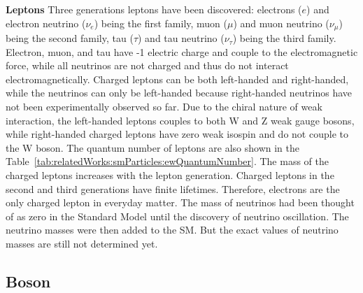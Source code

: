 \noindent \textbf{Leptons} Three generations leptons have been discovered: electrons ($e$) and electron neutrino ($\nu_e$) being the first family, muon ($\mu$) and muon neutrino ($\nu_\mu$) being the second family, tau ($\tau$) and tau neutrino ($\nu_\tau$) being the third family. Electron, muon, and tau have -1 electric charge and couple to the electromagnetic force, while all neutrinos are not charged and thus do not interact electromagnetically. Charged leptons can be both left-handed and right-handed, while the neutrinos can only be left-handed because right-handed neutrinos have not been experimentally observed so far. Due to the chiral nature of weak interaction, the left-handed leptons couples to both W and Z weak gauge bosons, while right-handed charged leptons have zero weak isospin and do not couple to the W boson. The quantum number of leptons are also shown in the Table~\ref{tab:relatedWorks:smParticles:ewQuantumNumber}. The mass of the charged leptons increases with the lepton generation. Charged leptons in the second and third generations have finite lifetimes. Therefore, electrons are the only charged lepton in everyday matter. The mass of neutrinos had been thought of as zero in the Standard Model until the discovery of neutrino oscillation. The neutrino masses were then added to the SM. But the exact values of neutrino masses are still not determined yet.




\subsection{Boson}
\label{sec:relatedWorks:smParticles:boson}

